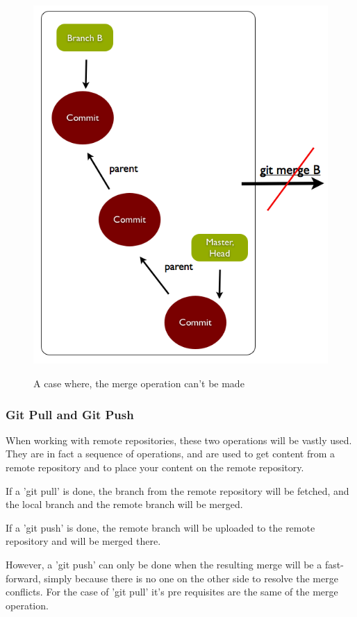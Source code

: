 \begin{figure} 
	\caption{A case where, the merge operation can't be made}
	\centering
	\includegraphics[scale=0.45]{images/nomerge.png}
	\label{fig:merge}
\end{figure}

\subsubsection{Git Pull and Git Push}

When working with remote repositories, these two operations will be vastly
used. They are in fact a sequence of operations, and are used to get content
from a remote repository and to place your content on the remote repository.
\par
If a 'git pull' is done, the branch from the remote repository will be fetched,
and the local branch and the remote branch will be merged. \par
If a 'git push' is done, the remote branch will be uploaded to the remote 
repository and will be merged there. \par
However, a 'git push' can only be done when the resulting merge will be a
fast-forward, simply because there is no one on the other side to resolve the 
merge conflicts. For the case of 'git pull' it's pre requisites are the same of
the merge operation. \par
